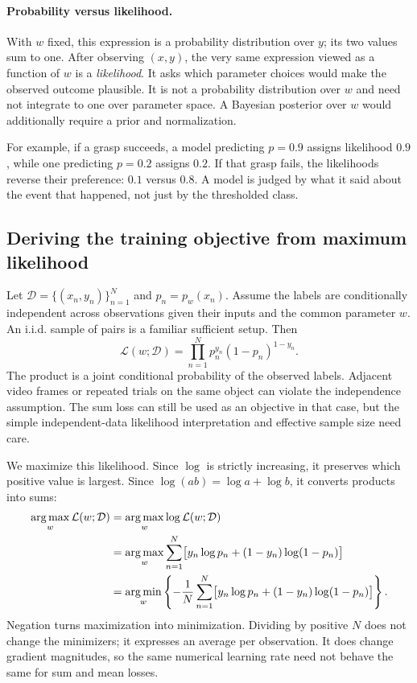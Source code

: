 \paragraph{Probability versus likelihood.}
With $w$ fixed, this expression is a probability distribution over $y$; its two
values sum to one. After observing $(x,y)$, the very same expression viewed as a
function of $w$ is a \emph{likelihood}. It asks which parameter choices would
make the observed outcome plausible. It is not a probability distribution over
$w$ and need not integrate to one over parameter space. A Bayesian posterior over
$w$ would additionally require a prior and normalization.

For example, if a grasp succeeds, a model predicting $p=0.9$ assigns likelihood
$0.9$, while one predicting $p=0.2$ assigns $0.2$. If that grasp fails, the
likelihoods reverse their preference: $0.1$ versus $0.8$. A model is judged by
what it said about the event that happened, not just by the thresholded class.

\subsection{Deriving the training objective from maximum likelihood}
Let $\mathcal D=\{(x_n,y_n)\}_{n=1}^N$ and $p_n=p_w(x_n)$. Assume the labels are
conditionally independent across observations given their inputs and the common
parameter $w$. An i.i.d. sample of pairs is a familiar sufficient setup. Then
\[
\mathcal L(w;\mathcal D)=\prod_{n=1}^N
p_n^{y_n}(1-p_n)^{1-y_n}.
\]
The product is a joint conditional probability of the observed labels. Adjacent
video frames or repeated trials on the same object can violate the independence
assumption. The sum loss can still be used as an objective in that case, but the
simple independent-data likelihood interpretation and effective sample size need
care.

We maximize this likelihood. Since $\log$ is strictly increasing, it preserves
which positive value is largest. Since $\log(ab)=\log a+\log b$, it converts
products into sums:
\begin{align*}
\operatorname*{arg\,max}_w\mathcal L(w;\mathcal D)
&=\operatorname*{arg\,max}_w\log\mathcal L(w;\mathcal D)\\
&=\operatorname*{arg\,max}_w\sum_{n=1}^N
\bigl[y_n\log p_n+(1-y_n)\log(1-p_n)\bigr]\\
&=\operatorname*{arg\,min}_w\left\{-\frac1N\sum_{n=1}^N
\bigl[y_n\log p_n+(1-y_n)\log(1-p_n)\bigr]\right\}.
\end{align*}
Negation turns maximization into minimization. Dividing by positive $N$ does not
change the minimizers; it expresses an average per observation. It does change
gradient magnitudes, so the same numerical learning rate need not behave the
same for sum and mean losses.

